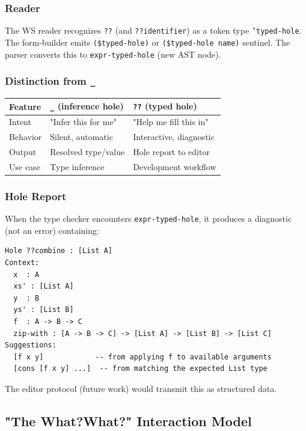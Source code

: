 \documentclass[11pt]{article}
\begin{document}
\subsubsection{Reader}
\label{sec:org2a8b72a}

The WS reader recognizes \texttt{??} (and \texttt{??identifier}) as a token type
\texttt{'typed-hole}. The form-builder emits \texttt{(\$typed-hole)} or \texttt{(\$typed-hole name)}
sentinel. The parser converts this to \texttt{expr-typed-hole} (new AST node).
\subsubsection{Distinction from \texttt{\_}}
\label{sec:orgf283c31}

\begin{center}
\begin{tabular}{lll}
Feature & \texttt{\_} (inference hole) & \texttt{??} (typed hole)\\
\hline
Intent & "Infer this for me" & "Help me fill this in"\\
Behavior & Silent, automatic & Interactive, diagnostic\\
Output & Resolved type/value & Hole report to editor\\
Use case & Type inference & Development workflow\\
\end{tabular}
\end{center}
\subsubsection{Hole Report}
\label{sec:orge5242be}

When the type checker encounters \texttt{expr-typed-hole}, it produces a diagnostic
(not an error) containing:

\begin{verbatim}
Hole ??combine : [List A]
Context:
  x  : A
  xs' : [List A]
  y  : B
  ys' : [List B]
  f  : A -> B -> C
  zip-with : [A -> B -> C] -> [List A] -> [List B] -> [List C]
Suggestions:
  [f x y]            -- from applying f to available arguments
  [cons [f x y] ...]  -- from matching the expected List type
\end{verbatim}

The editor protocol (future work) would transmit this as structured data.
\subsection{"The What?What?" Interaction Model}
\label{sec:org01d7ed4}
\end{document}
